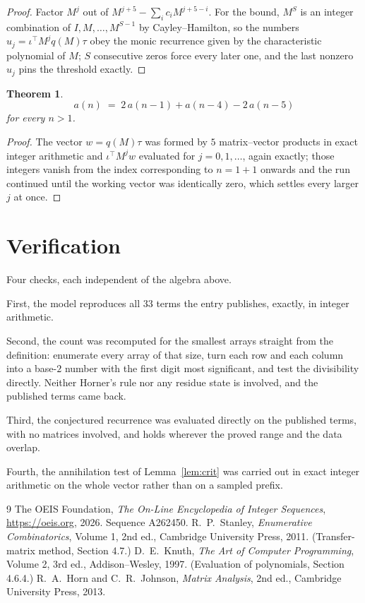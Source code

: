 \documentclass[11pt,a4paper]{article}
\theoremstyle{plain}
\newtheorem{theorem}{Theorem}
\theoremstyle{definition}
\begin{document}
\begin{proof}
Factor $M^{j}$ out of $M^{j+5}-\sum_ic_iM^{j+5-i}$. For the bound, $M^{S}$
is an integer combination of $I,M,\dots,M^{S-1}$ by Cayley--Hamilton, so the numbers
$u_j=\iota^{\!\top}M^{j}q(M)\tau$ obey the monic recurrence given by the characteristic
polynomial of $M$; $S$ consecutive zeros force every later one, and the last nonzero $u_j$
pins the threshold exactly.
\end{proof}

\begin{theorem}
\[
a(n)\;=\;2\,a(n-1) + a(n-4) - 2\,a(n-5)
\]
for every $n>1$.
\end{theorem}

\begin{proof}
The vector $w=q(M)\tau$ was formed by $5$ matrix--vector products in exact integer
arithmetic and $\iota^{\!\top}M^{j}w$ evaluated for $j=0,1,\dots$, again exactly; those
integers vanish from the index corresponding to $n=1+1$ onwards and the run continued
until the working vector was identically zero, which settles every larger $j$ at once.
\end{proof}

\section{Verification}

Four checks, each independent of the algebra above.

First, the model reproduces all $33$ terms the entry publishes, exactly, in integer
arithmetic.

Second, the count was recomputed for the smallest arrays straight from the definition:
enumerate every array of that size, turn each row and each column into a base-$2$ number with
the first digit most significant, and test the divisibility directly. Neither Horner's rule nor
any residue state is involved, and the published terms came back.

Third, the conjectured recurrence was evaluated directly on the published terms, with no
matrices involved, and holds wherever the proved range and the data overlap.

Fourth, the annihilation test of Lemma~\ref{lem:crit} was carried out in exact integer
arithmetic on the whole vector rather than on a sampled prefix.

\begin{thebibliography}{9}
 The OEIS Foundation, \emph{The On-Line Encyclopedia of Integer
Sequences}, \url{https://oeis.org}, 2026. Sequence A262450.
 R.~P.~Stanley, \emph{Enumerative Combinatorics}, Volume 1, 2nd ed.,
Cambridge University Press, 2011. (Transfer-matrix method, Section 4.7.)
 D.~E.~Knuth, \emph{The Art of Computer Programming}, Volume 2, 3rd ed.,
Addison--Wesley, 1997. (Evaluation of polynomials, Section 4.6.4.)
 R.~A.~Horn and C.~R.~Johnson, \emph{Matrix Analysis}, 2nd ed., Cambridge
University Press, 2013.
\end{thebibliography}
\end{document}
